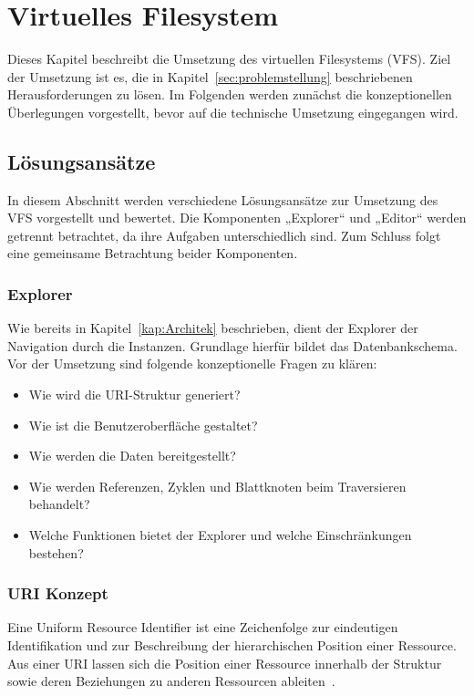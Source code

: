 \section{Virtuelles Filesystem}
\label{kap:vfs}
Dieses Kapitel beschreibt die Umsetzung des virtuellen Filesystems (VFS). Ziel der Umsetzung ist es, die in Kapitel~\ref{sec:problemstellung} beschriebenen Herausforderungen zu lösen. Im Folgenden werden zunächst die konzeptionellen Überlegungen vorgestellt, bevor auf die technische Umsetzung eingegangen wird.

\subsection{Lösungsansätze}
\label{sec:vfs-konzeption}
In diesem Abschnitt werden verschiedene Lösungsansätze zur Umsetzung des VFS vorgestellt und bewertet. Die Komponenten „Explorer“ und „Editor“ werden getrennt betrachtet, da ihre Aufgaben unterschiedlich sind. Zum Schluss folgt eine gemeinsame Betrachtung beider Komponenten.

\subsubsection{Explorer}
Wie bereits in Kapitel~\ref{kap:Architek} beschrieben, dient der Explorer der Navigation durch die Instanzen. Grundlage hierfür bildet das Datenbankschema. Vor der Umsetzung sind folgende konzeptionelle Fragen zu klären:
\begin{itemize}
  \item Wie wird die URI-Struktur generiert?
    \item Wie ist die Benutzeroberfläche gestaltet?
    \item Wie werden die Daten bereitgestellt?
    \item Wie werden Referenzen, Zyklen und Blattknoten beim Traversieren behandelt?
    \item Welche Funktionen bietet der Explorer und welche Einschränkungen bestehen?
\end{itemize}

\subsubsection*{URI Konzept}
\label{sec:urikonzept}
Eine Uniform Resource Identifier ist eine Zeichenfolge zur eindeutigen Identifikation und zur Beschreibung der hierarchischen Position einer Ressource. Aus einer URI lassen sich die Position einer Ressource innerhalb der Struktur sowie deren Beziehungen zu anderen Ressourcen ableiten~\cite{rfc3986}.

